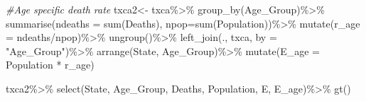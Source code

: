 \documentclass[
]{article}
\newenvironment{Shaded}{\begin{snugshade}}{\end{snugshade}}
\newcommand{\AttributeTok}[1]{\textcolor[rgb]{0.77,0.63,0.00}{#1}}
\newcommand{\CommentTok}[1]{\textcolor[rgb]{0.56,0.35,0.01}{\textit{#1}}}
\newcommand{\FunctionTok}[1]{\textcolor[rgb]{0.00,0.00,0.00}{#1}}
\newcommand{\NormalTok}[1]{#1}
\newcommand{\OtherTok}[1]{\textcolor[rgb]{0.56,0.35,0.01}{#1}}
\newcommand{\SpecialCharTok}[1]{\textcolor[rgb]{0.00,0.00,0.00}{#1}}
\newcommand{\StringTok}[1]{\textcolor[rgb]{0.31,0.60,0.02}{#1}}
\begin{document}
\begin{Shaded}
\begin{Highlighting}[]
\CommentTok{\#Age specific death rate}
\NormalTok{txca2}\OtherTok{\textless{}{-}}\NormalTok{ txca}\SpecialCharTok{\%\textgreater{}\%}
  \FunctionTok{group\_by}\NormalTok{(Age\_Group)}\SpecialCharTok{\%\textgreater{}\%}
  \FunctionTok{summarise}\NormalTok{(}\AttributeTok{ndeaths =} \FunctionTok{sum}\NormalTok{(Deaths), }\AttributeTok{npop=}\FunctionTok{sum}\NormalTok{(Population))}\SpecialCharTok{\%\textgreater{}\%}
  \FunctionTok{mutate}\NormalTok{(}\AttributeTok{r\_age =}\NormalTok{ ndeaths}\SpecialCharTok{/}\NormalTok{npop)}\SpecialCharTok{\%\textgreater{}\%}
  \FunctionTok{ungroup}\NormalTok{()}\SpecialCharTok{\%\textgreater{}\%}
  \FunctionTok{left\_join}\NormalTok{(., txca, }\AttributeTok{by =} \StringTok{"Age\_Group"}\NormalTok{)}\SpecialCharTok{\%\textgreater{}\%}
  \FunctionTok{arrange}\NormalTok{(State, Age\_Group)}\SpecialCharTok{\%\textgreater{}\%}
  \FunctionTok{mutate}\NormalTok{(}\AttributeTok{E\_age =}\NormalTok{ Population }\SpecialCharTok{*}\NormalTok{ r\_age)}

\NormalTok{txca2}\SpecialCharTok{\%\textgreater{}\%}
  \FunctionTok{select}\NormalTok{(State, Age\_Group, Deaths, Population, E, E\_age)}\SpecialCharTok{\%\textgreater{}\%}
  \FunctionTok{gt}\NormalTok{()}
\end{Highlighting}
\end{Shaded}
\end{document}
